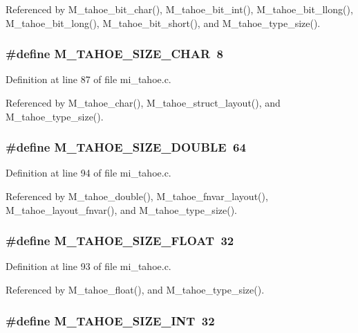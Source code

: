 Referenced by M\_\-tahoe\_\-bit\_\-char(), M\_\-tahoe\_\-bit\_\-int(), M\_\-tahoe\_\-bit\_\-llong(), M\_\-tahoe\_\-bit\_\-long(), M\_\-tahoe\_\-bit\_\-short(), and M\_\-tahoe\_\-type\_\-size().
\subsubsection{\setlength{\rightskip}{0pt plus 5cm}\#define M\_\-TAHOE\_\-SIZE\_\-CHAR~8}\label{mi__tahoe_8c_23b09183c832886dc4e924fbf35f72d9}




Definition at line 87 of file mi\_\-tahoe.c.

Referenced by M\_\-tahoe\_\-char(), M\_\-tahoe\_\-struct\_\-layout(), and M\_\-tahoe\_\-type\_\-size().
\subsubsection{\setlength{\rightskip}{0pt plus 5cm}\#define M\_\-TAHOE\_\-SIZE\_\-DOUBLE~64}\label{mi__tahoe_8c_dce92779f70f18269292effc6fc175dd}




Definition at line 94 of file mi\_\-tahoe.c.

Referenced by M\_\-tahoe\_\-double(), M\_\-tahoe\_\-fnvar\_\-layout(), M\_\-tahoe\_\-layout\_\-fnvar(), and M\_\-tahoe\_\-type\_\-size().
\subsubsection{\setlength{\rightskip}{0pt plus 5cm}\#define M\_\-TAHOE\_\-SIZE\_\-FLOAT~32}\label{mi__tahoe_8c_680b38b38d7116ce57b274c55d61303c}




Definition at line 93 of file mi\_\-tahoe.c.

Referenced by M\_\-tahoe\_\-float(), and M\_\-tahoe\_\-type\_\-size().
\subsubsection{\setlength{\rightskip}{0pt plus 5cm}\#define M\_\-TAHOE\_\-SIZE\_\-INT~32}\label{mi__tahoe_8c_7d2ad5ff6632ff48be6e85f87d0cbc7a}





